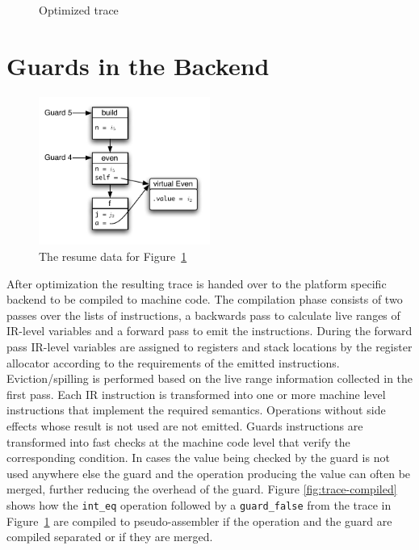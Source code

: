 \documentclass[10pt,preprint]{sigplanconf}
\begin{document}
\begin{figure}
    
    \caption{Optimized trace}
    \label{fig:trace-log}
\end{figure}
\section{Guards in the Backend}
\label{sec:Guards in the Backend}

\begin{figure}
\includegraphics[width=0.5\textwidth]{figures/resume_data.pdf}
\caption{The resume data for Figure~\ref{fig:trace-log}}
\label{fig:resume-data}
\end{figure}


After optimization the resulting trace is handed over to the platform specific
backend to be compiled to machine code. The compilation phase consists of two
passes over the lists of instructions, a backwards pass to calculate live
ranges of IR-level variables and a forward pass to emit the instructions. During
the forward pass IR-level variables are assigned to registers and stack
locations by the register allocator according to the requirements of the
emitted instructions.  Eviction/spilling is performed based on the live range
information collected in the first pass. Each IR instruction is transformed
into one or more machine level instructions that implement the required
semantics. Operations without side effects whose result is not used are not
emitted. Guards instructions are transformed into fast checks at the machine
code level that verify the corresponding condition.  In cases the value being
checked by the guard is not used anywhere else the guard and the operation
producing the value can often be merged, further reducing the overhead of the guard.
Figure \ref{fig:trace-compiled} shows how the \texttt{int\_eq} operation
followed by a \texttt{guard\_false} from the trace in Figure~\ref{fig:trace-log} are compiled to
pseudo-assembler if the operation and the guard are compiled separated or if
they are merged.
\end{document}
